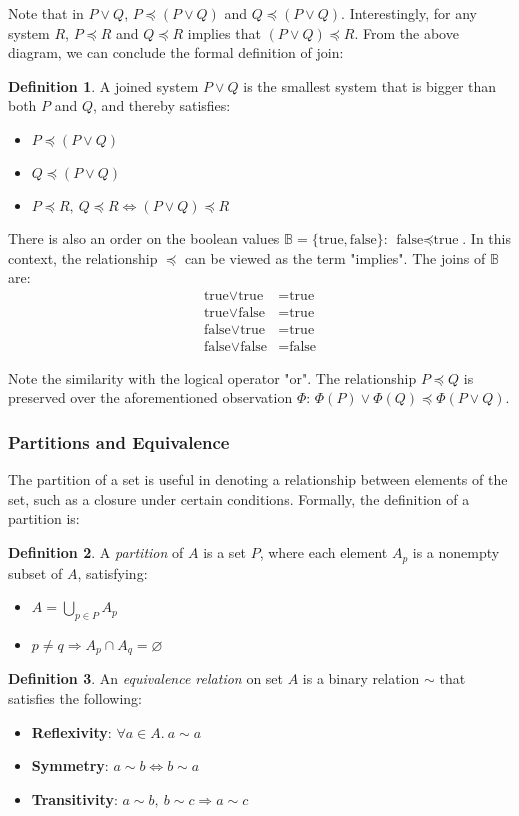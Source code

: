 \documentclass[12pt]{article}
\theoremstyle{definition}
\newtheorem{defn}{Definition}[section]
\newcommand{\T}{\text{true}}
\newcommand{\F}{\text{false}}
\begin{document}
	Note that in $P \lor Q$, $P \preceq (P \lor Q)$ and $Q \preceq (P \lor Q)$. Interestingly, for any system $R$, $P \preceq R$ and $Q \preceq R$ implies that $(P \lor Q) \preceq R$. From the above diagram, we can conclude the formal definition of join:
	\begin{defn}
		A joined system $P \lor Q$ is the smallest system that is bigger than both $P$ and $Q$, and thereby satisfies:
		\begin{itemize}
			\item $P \preceq (P \lor Q)$
			\item $Q \preceq (P \lor Q)$
			\item $P \preceq R,\ Q \preceq R \iff (P \lor Q) \preceq R$
		\end{itemize}
	\end{defn}
	
	There is also an order on the boolean values $\mathbb{B} = \{\T, \F\}$: $\F \preceq \T$. In this context, the relationship $\preceq$ can be viewed as the term "implies". The joins of $\mathbb{B}$ are:
	\begin{align*}
		\T \lor \T &= \T \\
		\T \lor \F &= \T \\
		\F \lor \T &= \T \\
		\F \lor \F &= \F
	\end{align*}
	
	Note the similarity with the logical operator "or".
	The relationship $P \preceq Q$ is preserved over the aforementioned observation $\Phi$: $\Phi(P) \lor \Phi(Q) \preceq \Phi(P \lor Q)$.
	
	\subsubsection{Partitions and Equivalence}
	
	The partition of a set is useful in denoting a relationship between elements of the set, such as a closure under certain conditions. Formally, the definition of a partition is:
	\begin{defn}
		A \emph{partition} of $A$ is a set $P$, where each element $A_p$ is a nonempty subset of $A$, satisfying:
		\begin{itemize}
			\item $A = \bigcup_{p \in P} A_p$
			\item $p \neq q \Rightarrow A_p \cap A_q = \varnothing$
		\end{itemize}
	\end{defn}
	\begin{defn}
		An \emph{equivalence relation} on set $A$ is a binary relation $\sim$ that satisfies the following:
		\begin{itemize}
			\item \textbf{Reflexivity}: $\forall a \in A.\ a \sim a$
			\item \textbf{Symmetry}: $a \sim b \iff b \sim a$
			\item \textbf{Transitivity}: $a \sim b,\ b \sim c \Rightarrow a \sim c$
		\end{itemize}
	\end{defn}
	
\end{document}
